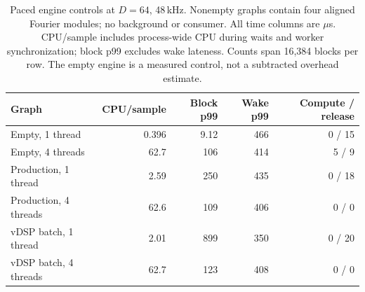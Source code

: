 \begin{table}[htbp]
\centering\small
\begin{tabular}{@{}lrrrr@{}}
\toprule
Graph & CPU/sample & Block p99 & Wake p99 & Compute / release \\
\midrule
Empty, 1 thread & 0.396 & 9.12 & 466 & 0 / 15 \\
Empty, 4 threads & 62.7 & 106 & 414 & 5 / 9 \\
Production, 1 thread & 2.59 & 250 & 435 & 0 / 18 \\
Production, 4 threads & 62.6 & 109 & 406 & 0 / 0 \\
vDSP batch, 1 thread & 2.01 & 899 & 350 & 0 / 20 \\
vDSP batch, 4 threads & 62.7 & 123 & 408 & 0 / 0 \\
\bottomrule
\end{tabular}
\caption{Paced engine controls at $D=64$, 48\,kHz. Nonempty graphs contain four aligned Fourier modules; no background or consumer. All time columns are $\mu$s. CPU/sample includes process-wide CPU during waits and worker synchronization; block p99 excludes wake lateness. Counts span 16,384 blocks per row. The empty engine is a measured control, not a subtracted overhead estimate.}
\label{tab:study-host-accounting}
\end{table}
